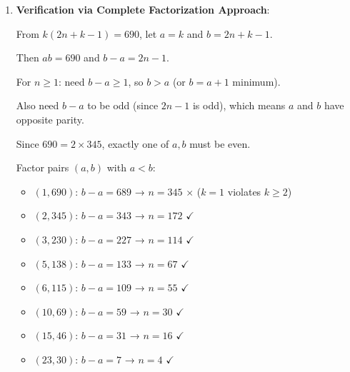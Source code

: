 \documentclass[11pt]{article}
\begin{document}
\begin{conversionbox}
\begin{enumerate}[leftmargin=*]
    For $k = 2m \geq 2$: $m \in \{1, 3, 5, 15, 23, 69, 115, 345\}$
    
    Check $n \geq 1$: From $m(2n + 2m - 1) = 345$:
    \[n = \frac{345/m - 2m + 1}{2}\]
    
    For large $m$, this becomes negative. Testing:
    
    For $m = 1$ (k=2): $n = 172$ $\checkmark$
    
    For $m = 3$ (k=6): $n = 55$ $\checkmark$
    
    For $m = 5$ (k=10): $n = 30$ $\checkmark$
    
    For $m = 15$ (k=30): $n = \frac{23-30+1}{2} = -3 < 0$ $\times$
    
    For $m = 23$ (k=46): $n = \frac{15-46+1}{2} = -15 < 0$ $\times$
    
    Valid even values: $k \in \{2, 6, 10\}$ → 3 solutions
    
    \textbf{Total from both cases}: $4 + 3 = 7$ solutions $\checkmark$
    
    \item \textbf{Verification via Complete Factorization Approach}:
    
    From $k(2n+k-1) = 690$, let $a = k$ and $b = 2n+k-1$.
    
    Then $ab = 690$ and $b - a = 2n - 1$.
    
    For $n \geq 1$: need $b - a \geq 1$, so $b > a$ (or $b = a + 1$ minimum).
    
    Also need $b - a$ to be odd (since $2n-1$ is odd), which means $a$ and $b$ have opposite parity.
    
    Since $690 = 2 \times 345$, exactly one of $a, b$ must be even.
    
    Factor pairs $(a,b)$ with $a < b$: 
    \begin{itemize}
        \item $(1, 690)$: $b - a = 689$ → $n = 345$ $\times$ ($k=1$ violates $k \geq 2$)
        \item $(2, 345)$: $b - a = 343$ → $n = 172$ $\checkmark$
        \item $(3, 230)$: $b - a = 227$ → $n = 114$ $\checkmark$
        \item $(5, 138)$: $b - a = 133$ → $n = 67$ $\checkmark$
        \item $(6, 115)$: $b - a = 109$ → $n = 55$ $\checkmark$
        \item $(10, 69)$: $b - a = 59$ → $n = 30$ $\checkmark$
        \item $(15, 46)$: $b - a = 31$ → $n = 16$ $\checkmark$
        \item $(23, 30)$: $b - a = 7$ → $n = 4$ $\checkmark$
    \end{itemize}
    

\end{enumerate}
\end{conversionbox}
\end{document}
